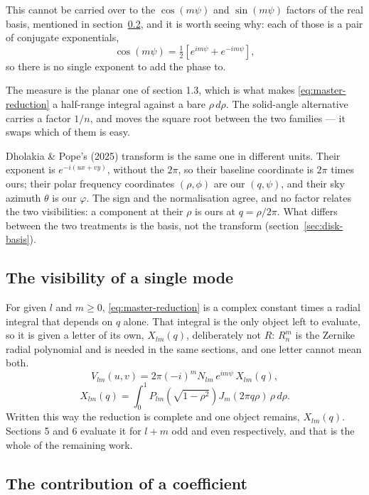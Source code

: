 This cannot be carried over to the $\cos(m\psi)$ and $\sin(m\psi)$ factors of the
real basis, mentioned in section~\ref{sec:contribution}, and it is worth seeing why: each of those is a
pair of conjugate exponentials,
\[
  \cos(m\psi) = \tfrac12\left[ e^{im\psi} + e^{-im\psi} \right] ,
\]
so there is no single exponent to add the phase to.

The measure is the planar one of section 1.3, which is what makes
\eqref{eq:master-reduction} a half-range integral against a bare $\rho\,d\rho$.
The solid-angle alternative carries a factor $1/n$, and moves the square root
between the two families --- it swaps which of them is easy.

Dholakia \& Pope's (2025) transform is the same one in different units.  Their
exponent is $e^{-i(ux+vy)}$, without the $2\pi$, so their baseline coordinate is
$2\pi$ times ours; their polar frequency coordinates $(\rho,\phi)$ are our $(q,\psi)$,
and their sky azimuth $\theta$ is our $\varphi$.  The sign and the normalisation
agree, and no factor relates the two visibilities: a component at their $\rho$ is
ours at $q = \rho/2\pi$.  What differs between the two treatments is the basis, not
the transform (section~\ref{sec:disk-basis}).

\subsection{The visibility of a single mode}
\label{sec:mode-visibility}

For given $l$ and $m \ge 0$, \eqref{eq:master-reduction} is a complex constant
times a radial integral that depends on $q$ alone.  That integral is the only object left to
evaluate, so it is given a letter of its own, $X_{lm}(q)$, deliberately not $R$: $R_n^m$ is the
Zernike radial polynomial and is needed in the same sections, and one letter cannot mean both.
\begin{equation}
  V_{lm}(u,v) = 2\pi(-i)^m N_{lm}\, e^{im\psi}\, X_{lm}(q) ,
  \label{eq:mode-visibility}
\end{equation}
\begin{equation}
  X_{lm}(q) = \int_0^1 P_{lm}\!\left(\sqrt{1-\rho^2}\right) J_m(2\pi q\rho)\,
  \rho\,d\rho .
  \label{eq:radial-integral}
\end{equation}
Written this way the reduction is complete and one object remains, $X_{lm}(q)$.
Sections 5 and 6 evaluate it for $l+m$ odd and even respectively, and that is the
whole of the remaining work.

\subsection{The contribution of a coefficient}
\label{sec:contribution}


